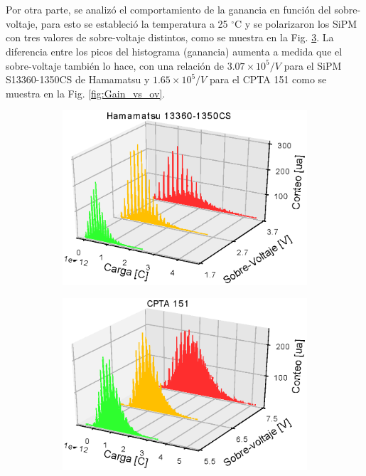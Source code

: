 \\ \\
Por otra parte, se analizó el comportamiento de la ganancia en función del sobre-voltaje, para esto se estableció la temperatura a 25 $^\circ$C y se polarizaron los SiPM con tres valores de sobre-voltaje distintos, como se muestra en la Fig. \ref{fig:His_G_vs_ov}. La diferencia entre los picos del histograma (ganancia) aumenta a medida que el sobre-voltaje también lo hace, con una relación de $3.07\times10^5/V$ para el SiPM  S13360-1350CS de Hamamatsu y $1.65\times10^5/V$ para el CPTA 151 como se muestra en la Fig. \ref{fig:Gain_vs_ov}. 
\begin{figure}[h!]
     \centering
        \caption{Histogramas de carga para tres valores de sobre-voltaje distintos a una temperatura de 25 $^\circ$C. La distancia entre los picos del histograma aumenta de forma directamente proporcional al valor del sobre-voltaje.}
     \begin{subfigure}[b]{0.49\textwidth}
         \centering
         \includegraphics[width=1.1\textwidth]{Images/G_ov_1350CS.eps}
         \label{fig:G_vs_ov_1350CS}
     \end{subfigure}
     \begin{subfigure}[b]{0.49\textwidth}
         \centering
         \includegraphics[width=1.1\textwidth]{Images/G_ov_CPTA151.eps}
         \label{fig:G_vs_ov_CPTA}
     \end{subfigure}
        \label{fig:His_G_vs_ov}
\end{figure}
